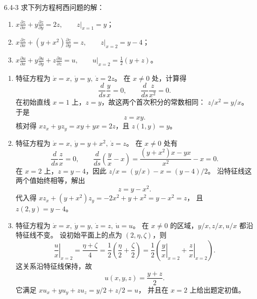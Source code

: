 \documentclass[UTF8,a4paper,11pt]{ctexart}
\begin{document}
\begin{problem}{6.4-3}
求下列方程柯西问题的解：
\begin{enumerate}[label=(\arabic*)]
\item $\displaystyle
x\frac{\partial z}{\partial x}
+y\frac{\partial z}{\partial y}=2z,\qquad
\left.z\right|_{x=1}=y$；
\item $\displaystyle
x\frac{\partial z}{\partial x}
+(y+x^2)\frac{\partial z}{\partial y}=z,\qquad
\left.z\right|_{x=2}=y-4$；
\item $\displaystyle
x\frac{\partial u}{\partial x}
+y\frac{\partial u}{\partial y}
+z\frac{\partial u}{\partial z}=u,\qquad
\left.u\right|_{x=2}=\frac12(y+z)$。
\end{enumerate}
\end{problem}
\begin{solution}
\begin{enumerate}[label=(\arabic*)]
\item 特征方程为
$\dot x=x,\ \dot y=y,\ \dot z=2z$。
在 $x\ne0$ 处，计算得
\[
\frac{d}{ds}\frac{y}{x}=0,\qquad
\frac{d}{ds}\frac{z}{x^2}=0.
\]
在初始直线 $x=1$ 上，$z=y$，故这两个首次积分的常数相同：
$z/x^2=y/x$。于是
\[
\boxed{z=xy.}
\]
核对得 $xz_x+yz_y=xy+yx=2z$，且 $z(1,y)=y$。

\item 特征方程为
$\dot x=x,\ \dot y=y+x^2,\ \dot z=z$。
在 $x\ne0$ 处有
\[
\frac{d}{ds}\frac{z}{x}=0,\qquad
\frac{d}{ds}\left(\frac{y}{x}-x\right)
=\frac{(y+x^2)x-yx}{x^2}-x=0.
\]
在 $x=2$ 上，$z=y-4$，因此
$z/x=(y/x)-x=(y-4)/2$。
沿特征线这两个值始终相等，解出
\[
\boxed{z=y-x^2.}
\]
代入得
$xz_x+(y+x^2)z_y=-2x^2+y+x^2=y-x^2=z$，
且 $z(2,y)=y-4$。

\item 特征方程为
$\dot x=x,\ \dot y=y,\ \dot z=z,\ \dot u=u$。
在 $x\ne0$ 的区域，$y/x,z/x,u/x$ 都沿特征线不变。
设初始平面上的点为 $(2,\eta,\zeta)$，则
\[
\left.\frac{u}{x}\right|_{x=2}
=\frac{\eta+\zeta}{4}
=\frac12\left(\frac{\eta}{2}+\frac{\zeta}{2}\right)
=\frac12\left(\left.\frac{y}{x}\right|_{x=2}
+\left.\frac{z}{x}\right|_{x=2}\right).
\]
这关系沿特征线保持，故
\[
\boxed{u(x,y,z)=\frac{y+z}{2}.}
\]
它满足 $xu_x+yu_y+zu_z=y/2+z/2=u$，
并且在 $x=2$ 上给出题定初值。
\end{enumerate}
\end{solution}
\end{document}
